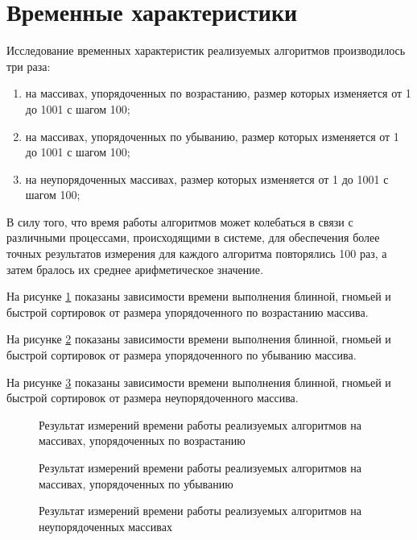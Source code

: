 \section{Временные характеристики}

Исследование временных характеристик реализуемых алгоритмов производилось три раза:

\begin{enumerate}
    \item на массивах, упорядоченных по возрастанию, размер которых изменяется от 1 до 1001 с шагом 100;
    \item на массивах, упорядоченных по убыванию, размер которых изменяется от 1 до 1001 с шагом 100;
    \item на неупорядоченных массивах, размер которых изменяется от 1 до 1001 с шагом 100;
\end{enumerate}

В силу того, что время работы алгоритмов может колебаться в связи с различными процессами, происходящими в системе, для обеспечения более точных результатов измерения для каждого алгоритма повторялись 100 раз, а затем бралось их среднее арифметическое значение.

На рисунке \ref{fig:forw-time} показаны зависимости времени выполнения блинной, гномьей и быстрой сортировок от размера упорядоченного по возрастанию массива.

На рисунке \ref{fig:backw-time} показаны зависимости времени выполнения блинной, гномьей и быстрой сортировок от размера упорядоченного по убыванию массива.

На рисунке \ref{fig:rand-time} показаны зависимости времени выполнения блинной, гномьей и быстрой сортировок от размера неупорядоченного массива.

\begin{figure}[H]
    \centering
    
    \caption{Результат измерений времени работы реализуемых алгоритмов на массивах, упорядоченных по возрастанию}
    \label{fig:forw-time}
\end{figure}

\begin{figure}[H]
    \centering
    
    \caption{Результат измерений времени работы реализуемых алгоритмов на массивах, упорядоченных по убыванию}
    \label{fig:backw-time}
\end{figure}

\begin{figure}[H]
    \centering
    
    \caption{Результат измерений времени работы реализуемых алгоритмов на неупорядоченных массивах}
    \label{fig:rand-time}
\end{figure}

